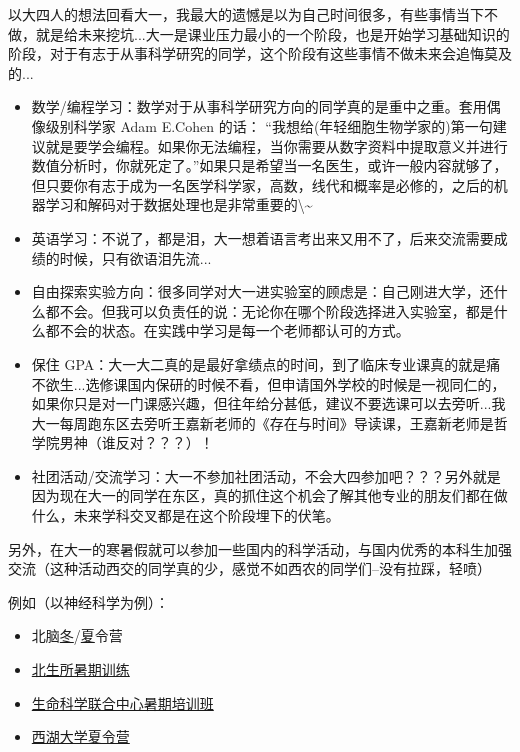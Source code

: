 \documentclass[zihao=-4,fontset=none]{Beautybook-CN}
\begin{document}
以大四人的想法回看大一，我最大的遗憾是以为自己时间很多，有些事情当下不做，就是给未来挖坑...大一是课业压力最小的一个阶段，也是开始学习基础知识的阶段，对于有志于从事科学研究的同学，这个阶段有这些事情不做未来会追悔莫及的...
\begin{itemize}
    \item 数学/编程学习：数学对于从事科学研究方向的同学真的是重中之重。套用偶像级别科学家 Adam E.Cohen 的话： “我想给(年轻细胞生物学家的)第一句建议就是要学会编程。如果你无法编程，当你需要从数字资料中提取意义并进行数值分析时，你就死定了。”如果只是希望当一名医生，或许一般内容就够了，但只要你有志于成为一名医学科学家，高数，线代和概率是必修的，之后的机器学习和解码对于数据处理也是非常重要的\textbackslash \textasciitilde{}
    \item 英语学习：不说了，都是泪，大一想着语言考出来又用不了，后来交流需要成绩的时候，只有欲语泪先流...
    \item 自由探索实验方向：很多同学对大一进实验室的顾虑是：自己刚进大学，还什么都不会。但我可以负责任的说：无论你在哪个阶段选择进入实验室，都是什么都不会的状态。在实践中学习是每一个老师都认可的方式。
    \item 保住 GPA：大一大二真的是最好拿绩点的时间，到了临床专业课真的就是痛不欲生...选修课国内保研的时候不看，但申请国外学校的时候是一视同仁的，如果你只是对一门课感兴趣，但往年给分甚低，建议不要选课可以去旁听...我大一每周跑东区去旁听王嘉新老师的《存在与时间》导读课，王嘉新老师是哲学院男神（谁反对？？？）！
\item 社团活动/交流学习：大一不参加社团活动，不会大四参加吧？？？另外就是因为现在大一的同学在东区，真的抓住这个机会了解其他专业的朋友们都在做什么，未来学科交叉都是在这个阶段埋下的伏笔。
\end{itemize}

另外，在大一的寒暑假就可以参加一些国内的科学活动，与国内优秀的本科生加强交流（这种活动西交的同学真的少，感觉不如西农的同学们--没有拉踩，轻喷）

例如（以神经科学为例）：
\begin{itemize}
    \item 北脑\href{https://www.cibr.ac.cn/Personnel/admissions/shortDetail/1159?language=cn}{冬}/\href{https://www.cibr.ac.cn/Personnel/admissions/shortDetail/665?language=cn}{夏}令营
\item \href{http://www.nibs.ac.cn/yjsjyshow.php?cid=8&sid=28&zid=41&id=2584}{北生所暑期训练}

\item \href{https://www.cls.edu.cn/EducationTraining/undergraduate/foster1132.shtml}{生命科学联合中心暑期培训班}

\item \href{https://www.westlake.edu.cn/admissions_aid/shorttermprograms/}{西湖大学夏令营}
\end{itemize}
\end{document}
